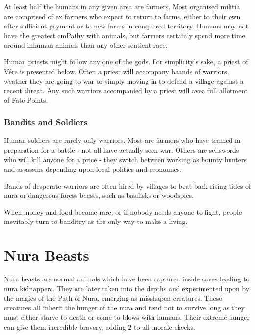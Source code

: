 \label{human_trader}
\humantrader

At least half the humans in any given area are farmers.  Most organised militia are comprised of ex farmers who expect to return to farms, either to their own after sufficient payment or to new farms in conquered territory.  Humans may not have the greatest emPathy with animals, but farmers certainly spend more time around inhuman animals than any other sentient race.

\label{human_priest}
\humanpriest

Human priests might follow any one of the gods.  For simplicity's sake, a priest of V\'{e}re is presented below.  Often a priest will accompany baands of warriors, weather they are going to war or simply moving in to defend a village against a recent threat.  Any such warriors accompanied by a priest will avea full allotment of Fate Points.

\label{human_soldier}
\subsubsection{Bandits and Soldiers}
\humansoldier

Human soldiers are rarely only warriors.  Most are farmers who have trained in preparation for a battle - not all have actually seen war.  Others are sellswords who will kill anyone for a price - they switch between working as bounty hunters and assassins depending upon local politics and economics.

	Bands of desperate warriors are often hired by villages to beat back rising tides of nura or dangerous forest beasts, such as basilisks or woodspies.

When money and food become rare, or if nobody needs anyone to fight, people inevitably turn to banditry as the only way to make a living.

\section{Nura Beasts}

Nura beasts are normal animals which have been captured inside caves leading to nura kidnappers.  They are later taken into the depths and experimented upon by the magics of the Path of Nura, emerging as misshapen creatures.  These creatures all inherit the hunger of the nura and tend not to survive long as they must either starve to death or come to blows with humans.  Their extreme hunger can give them incredible bravery, adding 2 to all morale checks.

